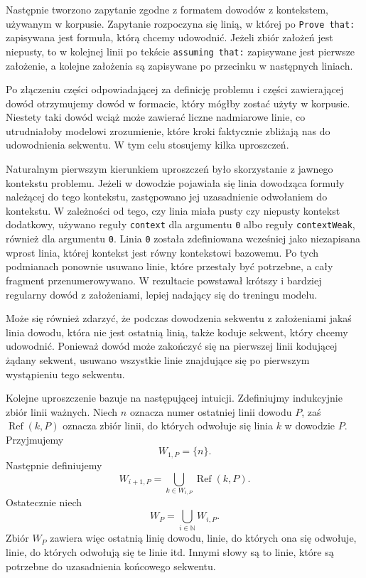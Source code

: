 \documentclass[shortabstract]{iithesis}
\theoremstyle{definition}
\theoremstyle{remark}
\theoremstyle{plain}
\begin{document}
Następnie tworzono zapytanie zgodne z formatem dowodów z kontekstem, używanym
w korpusie. Zapytanie rozpoczyna się linią, w której po \texttt{Prove that:}
zapisywana jest formuła, którą chcemy udowodnić. Jeżeli zbiór założeń jest
niepusty, to w kolejnej linii po tekście \texttt{assuming that:} zapisywane jest
pierwsze założenie, a kolejne założenia są zapisywane po przecinku w następnych
liniach.

Po złączeniu części odpowiadającej za definicję problemu i części zawierającej
dowód otrzymujemy dowód w formacie, który mógłby zostać użyty w korpusie.
Niestety taki dowód wciąż może zawierać liczne nadmiarowe linie, co utrudniałoby
modelowi zrozumienie, które kroki faktycznie zbliżają nas do udowodnienia
sekwentu. W tym celu stosujemy kilka uproszczeń.

Naturalnym pierwszym kierunkiem
uproszczeń było skorzystanie z jawnego kontekstu problemu. Jeżeli w dowodzie
pojawiała się linia dowodząca formuły należącej do tego kontekstu, zastępowano
jej uzasadnienie odwołaniem do kontekstu. W zależności od tego, czy linia miała
pusty czy niepusty kontekst dodatkowy, używano reguły \texttt{context} dla
argumentu \texttt{0} albo reguły \texttt{contextWeak}, również dla argumentu
\texttt{0}. Linia \texttt{0} została zdefiniowana wcześniej jako niezapisana
wprost linia, której kontekst jest równy kontekstowi bazowemu. Po tych podmianach
ponownie usuwano linie, które przestały być potrzebne, a cały fragment
przenumerowywano. W rezultacie powstawał krótszy i bardziej regularny dowód
z założeniami, lepiej nadający się do treningu modelu.

Może się również zdarzyć, że podczas dowodzenia sekwentu z założeniami jakaś
linia dowodu, która nie jest ostatnią linią, także koduje sekwent, który chcemy
udowodnić. Ponieważ dowód może zakończyć się na pierwszej linii kodującej żądany
sekwent, usuwano wszystkie linie znajdujące się po pierwszym wystąpieniu tego
sekwentu.


Kolejne uproszczenie bazuje na następującej intuicji. Zdefiniujmy indukcyjnie
zbiór linii ważnych. Niech \(n\) oznacza numer ostatniej linii dowodu \(P\), zaś
\(\operatorname{Ref}(k,P)\) oznacza zbiór linii, do których odwołuje się linia
\(k\) w dowodzie \(P\). Przyjmujemy
\[
W_{1,P} = \{n\}.
\]
Następnie definiujemy
\[
W_{i+1,P}
=
\bigcup_{k \in W_{i,P}} \operatorname{Ref}(k,P).
\]
Ostatecznie niech
\[
W_P = \bigcup_{i \in \mathbb{N}} W_{i,P}.
\]
Zbiór \(W_P\) zawiera więc ostatnią linię dowodu, linie, do których ona się
odwołuje, linie, do których odwołują się te linie itd. Innymi słowy są to linie,
które są potrzebne do uzasadnienia końcowego sekwentu.
\end{document}
